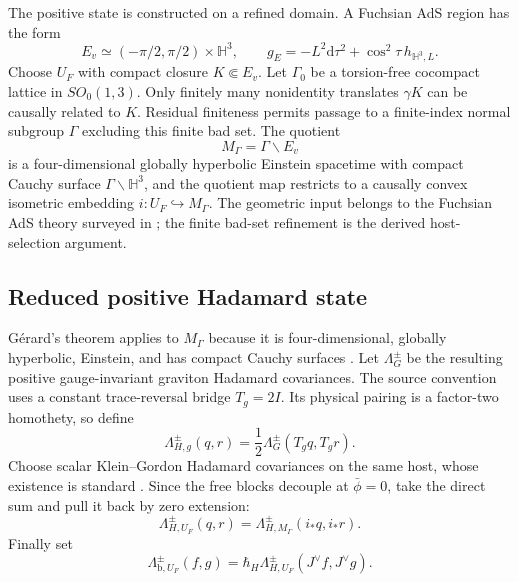 \documentclass[11pt]{article}
\theoremstyle{definition}
\theoremstyle{remark}
\newcommand{\U}{U_{F}}
\newcommand{\M}{M_{\Gamma}}
\newcommand{\dd}{\mathrm d}
\begin{document}
The positive state is constructed on a refined domain.  A Fuchsian AdS region has
the form
\begin{equation}
 E_v\simeq(-\pi/2,\pi/2)\times\mathbb H^3,
 \qquad
 g_E=-L^2\dd\tau^2+\cos^2\tau\,h_{\mathbb H^3,L}.
 \label{eq:fuchsian}
\end{equation}
Choose $\U$ with compact closure $K\Subset E_v$.  Let $\Gamma_0$ be a torsion-free
cocompact lattice in $SO_0(1,3)$.  Only finitely many nonidentity translates
$\gamma K$ can be causally related to $K$.  Residual finiteness permits passage to a
finite-index normal subgroup $\Gamma$ excluding this finite bad set.  The quotient
\begin{equation}
 \M=\Gamma\backslash E_v
 \label{eq:host}
\end{equation}
is a four-dimensional globally hyperbolic Einstein spacetime with compact Cauchy
surface $\Gamma\backslash\mathbb H^3$, and the quotient map restricts to a causally
convex isometric embedding $i:\U\hookrightarrow\M$.  The geometric input belongs to
the Fuchsian AdS theory surveyed in \cite{Barbot2013}; the finite bad-set refinement is
the derived host-selection argument.

\subsection{Reduced positive Hadamard state}

G\'erard's theorem applies to $\M$ because it is four-dimensional, globally
hyperbolic, Einstein, and has compact Cauchy surfaces \cite{Gerard2023}.  Let
$\Lambda_G^\pm$ be the resulting positive gauge-invariant graviton Hadamard
covariances.  The source convention uses a constant trace-reversal bridge
$T_g=2I$.  Its physical pairing is a factor-two homothety, so define
\begin{equation}
 \Lambda_{H,g}^\pm(q,r)=\frac12\Lambda_G^\pm(T_gq,T_gr).
 \label{eq:factorhalf}
\end{equation}
Choose scalar Klein--Gordon Hadamard covariances on the same host, whose existence is
standard \cite{GerardWrochna2014,Radzikowski1996}.  Since the free blocks decouple at
$\bar\phi=0$, take the direct sum and pull it back by zero extension:
\begin{equation}
 \Lambda_{H,\U}^\pm(q,r)=\Lambda_{H,\M}^\pm(i_*q,i_*r).
 \label{eq:pullstate}
\end{equation}
Finally set
\begin{equation}
 \Lambda_{\mathrm{b},\U}^\pm(f,g)=
 \hbar_H\Lambda_{H,\U}^\pm(J^\vee f,J^\vee g).
 \label{eq:LBcov}
\end{equation}
\end{document}
